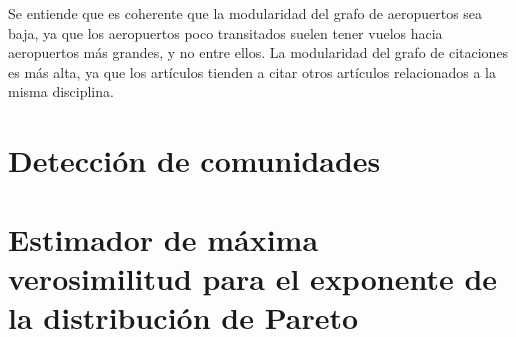 \documentclass{article}
\begin{document}
Se entiende que es coherente que la modularidad del grafo de aeropuertos sea baja, ya que los aeropuertos poco transitados suelen tener vuelos hacia aeropuertos más grandes, y no entre ellos. La modularidad del grafo de citaciones es más alta, ya que los artículos tienden a citar otros artículos relacionados a la misma disciplina.

\section{Detección de comunidades} \label{sec: comunidades}

\section{Estimador de máxima verosimilitud para el exponente de la distribución de Pareto} \label{sec: pareto}
\end{document}
